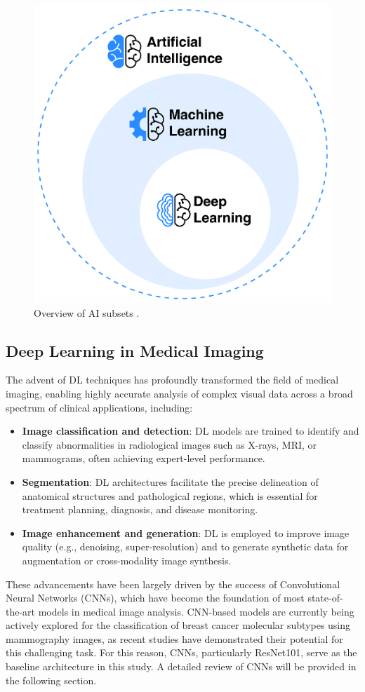 \documentclass[a4paper,10pt]{book}
\begin{document}
\begin{figure}[h!]
    \centering
    \includegraphics[width=0.5\linewidth]{reports//assets/ai.png}
    \caption[AI subsets overview]{Overview of AI subsets \cite{nasaWhatArtificialIntelligence}.}
    \label{fig:ai_overview}
\end{figure}


\subsection{Deep Learning in Medical Imaging}

The advent of DL techniques has profoundly transformed the field of medical imaging, enabling highly accurate analysis of complex visual data across a broad spectrum of clinical applications, including:

\begin{itemize}
    \item \textbf{Image classification and detection}: DL models are trained to identify and classify abnormalities in radiological images such as X-rays, MRI, or mammograms, often achieving expert-level performance.
    \item \textbf{Segmentation}: DL architectures facilitate the precise delineation of anatomical structures and pathological regions, which is essential for treatment planning, diagnosis, and disease monitoring.
    \item \textbf{Image enhancement and generation}: DL is employed to improve image quality (e.g., denoising, super-resolution) and to generate synthetic data for augmentation or cross-modality image synthesis.
\end{itemize}

These advancements have been largely driven by the success of Convolutional Neural Networks (CNNs), which have become the foundation of most state-of-the-art models in medical image analysis. CNN-based models are currently being actively explored for the classification of breast cancer molecular subtypes using mammography images, as recent studies have demonstrated their potential for this challenging task\cite{mota_breast_2024, ben_rabah_multimodal_2025}. For this reason, CNNs, particularly ResNet101, serve as the baseline architecture in this study. A detailed review of CNNs will be provided in the following section.
\end{document}
